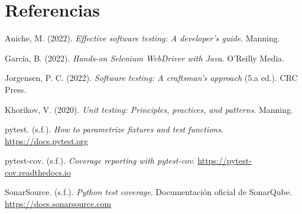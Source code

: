 \documentclass{article}
\begin{document}
\section*{Referencias}

Aniche, M. (2022). \textit{Effective software testing: A developer's guide}. Manning.

García, B. (2022). \textit{Hands-on Selenium WebDriver with Java}. O'Reilly Media.

Jorgensen, P. C. (2022). \textit{Software testing: A craftsman's approach} (5.a ed.). CRC Press.

Khorikov, V. (2020). \textit{Unit testing: Principles, practices, and patterns}. Manning.

pytest. (s.f.). \textit{How to parametrize fixtures and test functions}. \url{https://docs.pytest.org}

pytest-cov. (s.f.). \textit{Coverage reporting with pytest-cov}. \url{https://pytest-cov.readthedocs.io}

SonarSource. (s.f.). \textit{Python test coverage}. Documentación oficial de SonarQube. \url{https://docs.sonarsource.com}
\end{document}

